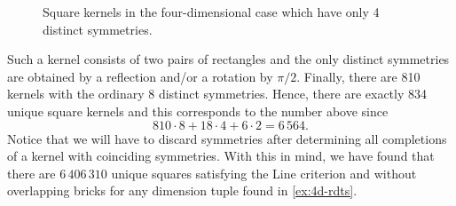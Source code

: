 \begin{observation}
\begin{figure}[ht]
\begin{subfigure}[b]{0.14\textwidth}
\begin{tikzpicture}[scale=0.07]
        \end{tikzpicture}
    \end{subfigure}
    ~
    \begin{subfigure}[b]{0.14\textwidth}
        \centering
        \begin{tikzpicture}[scale=0.07]
            
        \end{tikzpicture}
    \end{subfigure}
    ~
    \begin{subfigure}[b]{0.14\textwidth}
        \centering
        \begin{tikzpicture}[scale=0.07]
            
        \end{tikzpicture}
    \end{subfigure}
    ~
    \begin{subfigure}[b]{0.14\textwidth}
        \centering
        \begin{tikzpicture}[scale=0.07]
            
        \end{tikzpicture}
    \end{subfigure}
    ~
    \begin{subfigure}[b]{0.14\textwidth}
        \centering
        \begin{tikzpicture}[scale=0.07]
            
        \end{tikzpicture}
    \end{subfigure}
    ~
    \begin{subfigure}[b]{0.14\textwidth}
        \centering
        \begin{tikzpicture}[scale=0.07]
            
        \end{tikzpicture}
    \end{subfigure}
    \caption{Square kernels in the four-dimensional case which have only 4 distinct symmetries.}
    \label{fig:4d-square-self-four-symmetric-kernels}
\end{figure}

Such a kernel consists of two pairs of rectangles and the only distinct symmetries are obtained by a reflection and/or a rotation by $\pi/2$. Finally, there are 810 kernels with the ordinary 8 distinct symmetries. Hence, there are exactly 834 unique square kernels and this corresponds to the number above since
\[
810 \cdot 8 + 18 \cdot 4 + 6 \cdot 2 = 6\,564.
\]
Notice that we will have to discard symmetries after determining all completions of a kernel with coinciding symmetries. With this in mind, we have found that there are $6\,406\,310$ unique squares satisfying the Line criterion  and without overlapping bricks for any dimension tuple found in \cref{ex:4d-rdts}.
\end{observation}


